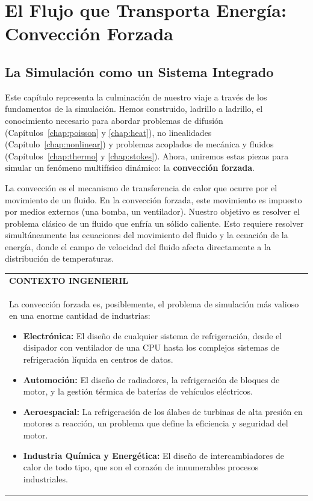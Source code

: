 \chapter{El Flujo que Transporta Energía: Convección Forzada}
\label{chap:convection}

\section{La Simulación como un Sistema Integrado}

Este capítulo representa la culminación de nuestro viaje a través de los fundamentos de la simulación. Hemos construido, ladrillo a ladrillo, el conocimiento necesario para abordar problemas de difusión (Capítulos~\ref{chap:poisson} y \ref{chap:heat}), no linealidades (Capítulo~\ref{chap:nonlinear}) y problemas acoplados de mecánica y fluidos (Capítulos~\ref{chap:thermo} y \ref{chap:stokes}). Ahora, uniremos estas piezas para simular un fenómeno multifísico dinámico: la \textbf{convección forzada}.

La convección es el mecanismo de transferencia de calor que ocurre por el movimiento de un fluido. En la convección forzada, este movimiento es impuesto por medios externos (una bomba, un ventilador). Nuestro objetivo es resolver el problema clásico de un fluido que enfría un sólido caliente. Esto requiere resolver simultáneamente las ecuaciones del movimiento del fluido y la ecuación de la energía, donde el campo de velocidad del fluido afecta directamente a la distribución de temperaturas.

\begin{center}
\begin{tabular}{|p{}|}
\hline
\textbf{CONTEXTO INGENIERIL} \\
La convección forzada es, posiblemente, el problema de simulación más valioso en una enorme cantidad de industrias:
\begin{itemize}
    \item \textbf{Electrónica:} El diseño de cualquier sistema de refrigeración, desde el disipador con ventilador de una CPU hasta los complejos sistemas de refrigeración líquida en centros de datos.
    \item \textbf{Automoción:} El diseño de radiadores, la refrigeración de bloques de motor, y la gestión térmica de baterías de vehículos eléctricos.
    \item \textbf{Aeroespacial:} La refrigeración de los álabes de turbinas de alta presión en motores a reacción, un problema que define la eficiencia y seguridad del motor.
    \item \textbf{Industria Química y Energética:} El diseño de intercambiadores de calor de todo tipo, que son el corazón de innumerables procesos industriales.
\end{itemize}
\\
\hline
\end{tabular}
\end{center}

